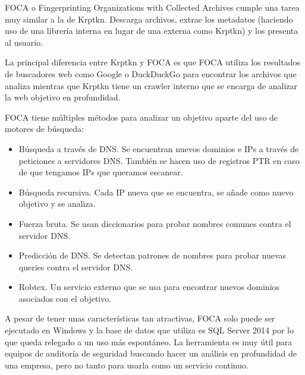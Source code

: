 FOCA o Fingerprinting Organizations with Collected Archives cumple una tarea muy similar a la de Krptkn. Descarga archivos, extrae los metadatos (haciendo uso de una librería interna en lugar de una externa como Krptkn) y los presenta al usuario.

La principal diferencia entre Krptkn y FOCA es que FOCA utiliza los resultados de buscadores web como Google o DuckDuckGo para encontrar los archivos que analiza mientras que Krptkn tiene un crawler interno que se encarga de analizar la web objetivo en profundidad.

FOCA tiene múltiples métodos para analizar un objetivo aparte del uso de motores de búsqueda:

\begin{itemize}
  \item Búsqueda a través de DNS. Se encuentran nuevos dominios e IPs a través de peticiones a servidores DNS. También se hacen uso de registros PTR en caso de que tengamos IPs que queramos escanear.
  \item Búsqueda recursiva. Cada IP nueva que se encuentra, se añade como nuevo objetivo y se analiza. 
  \item Fuerza bruta. Se usan diccionarios para probar nombres comunes contra el servidor DNS.
  \item Predicción de DNS. Se detectan patrones de nombres para probar nuevas queries contra el servidor DNS.
  \item Robtex. Un servicio externo que se usa para encontrar nuevos dominios asociados con el objetivo.
\end{itemize}

A pesar de tener unas características tan atractivas, FOCA solo puede ser ejecutado en Windows y la base de datos que utiliza es SQL Server 2014 por lo que queda relegado a un uso más espontáneo. La herramienta es muy útil para equipos de auditoría de seguridad buscando hacer un análisis en profundidad de una empresa, pero no tanto para usarla como un servicio continuo.
